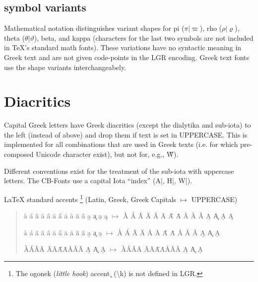 \documentclass{article}
\newcommand{\LGR}{\fontencoding{LGR}\selectfont}
\newcommand{\Latin}{\fontencoding{\encodingdefault}\selectfont}
\begin{document}
\subsection{symbol variants}

Mathematical notation distinguishes variant shapes for pi ($\pi|\varpi$),
rho ($\rho|\varrho$), theta ($\theta|\vartheta$), beta, and kappa
(characters for the last two symbols are not included in TeX's standard math
fonts). These variations have no syntactic meaning in Greek text and are not
given code-points in the LGR encoding. Greek text fonts use the shape
variants interchangeabely.

\section{Diacritics}

Capital Greek letters have Greek diacritics (except the dialytika and
sub-iota) to the left (instead of above) and drop them if text is set in
UPPERCASE. This is implemented for all combinations that are used in Greek
texts (i.e. for which pre-composed Unicode character exist), but not for,
e.g., \LGR\~W\Latin).


Different conventions exist for the treatment of the sub-iota with uppercase
letters. The CB-Fonts use a capital Iota ``index'' (\LGR A|, H|, W|\Latin).

LaTeX standard accents%
\footnote{The ogonek (\emph{little hook}) accent \k{ } (\textbackslash k)
is not defined in LGR.}
(Latin, Greek, Greek Capitals $\mapsto$ UPPERCASE)

\begin{quote}
  \`{a} \'{a} \~{a} \"{a} \^{a} \={a} \H{a} \.{a} \r{a} \u{a} \v{a}
  \b{a} \c{a} \d{a} \k{a}
  $\mapsto$ \MakeUppercase{%
  \`{a} \'{a} \~{a} \"{a} \^{a} \={a} \H{a} \.{a} \r{a} \u{a} \v{a}
  \b{a} \c{a} \d{a} \k{a}
  }

  \LGR
  \`{a} \'{a} \~{a} \"{a} \^{a} \={a} \H{a} \.{a} \r{a} \u{a} \v{a}
  \b{a} \c{a} \d{a}
  $\mapsto$ \MakeUppercase{%
  \`{a} \'{a} \~{a} \"{a} \^{a} \={a} \H{a} \.{a} \r{a} \u{a} \v{a}
  \b{a} \c{a} \d{a}
  }

  \`{A}\'{A}\~{A}\"{A} \^{A}\={A}\H{A}\.{A}\r{A}\u{A}\v{A}
  \b{A} \c{A} \d{A}
  $\mapsto$ \MakeUppercase{%
  \`{A}\'{A}\~{A}\"{A} \^{A}\={A}\H{A}\.{A}\r{A}\u{A}\v{A}
  \b{A} \c{A} \d{A}
  }
\end{quote}
\end{document}
